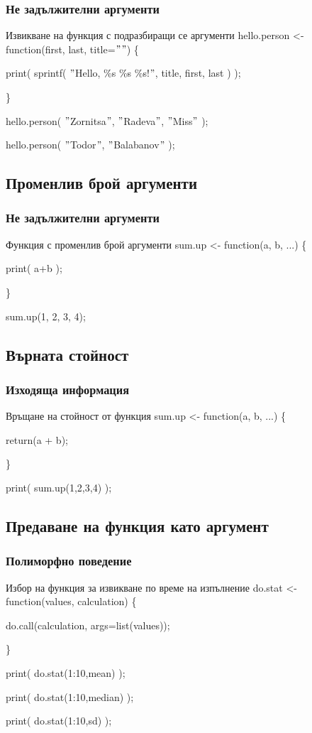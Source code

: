 \documentclass{beamer}
\begin{document}
\begin{frame}
\frametitle{Не задължителни аргументи}
\begin{block}{Извикване на функция с подразбиращи се аргументи}
hello.person <- function(first, last, title=$"$$"$) \{

	print( sprintf( $"$Hello, \%s \%s \%s!$"$, title, first, last ) );

\}

hello.person( $"$Zornitsa$"$, $"$Radeva$"$, $"$Miss$"$ );

hello.person( $"$Todor$"$, $"$Balabanov$"$ );
\end{block}
\end{frame}

\subsection{Променлив брой аргументи}

\begin{frame}
\frametitle{Не задължителни аргументи}
\begin{block}{Функция с променлив брой аргументи}
sum.up <- function(a, b, ...) \{

	print( a+b );

\}

sum.up(1, 2, 3, 4);
\end{block}
\end{frame}

\subsection{Върната стойност}

\begin{frame}
\frametitle{Изходяща информация}
\begin{block}{Връщане на стойност от функция}
sum.up <- function(a, b, ...) \{

	return(a + b);

\}

print( sum.up(1,2,3,4) );
\end{block}
\end{frame}

\subsection{Предаване на функция като аргумент}

\begin{frame}
\frametitle{Полиморфно поведение}
\begin{block}{Избор на функция за извикване по време на изпълнение}
do.stat <- function(values, calculation) \{

	do.call(calculation, args=list(values));

\}

print( do.stat(1:10,mean) );

print( do.stat(1:10,median) );

print( do.stat(1:10,sd) );
\end{block}
\end{frame}
\end{document}
